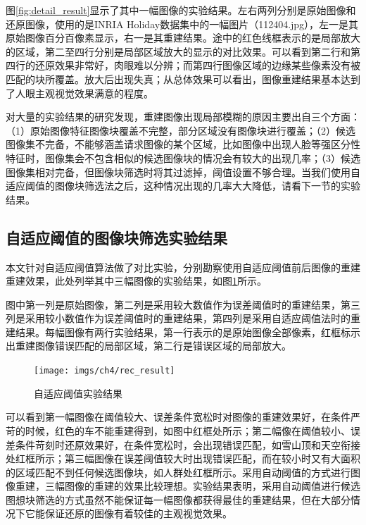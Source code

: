 图\ref{fig:detail_result}显示了其中一幅图像的实验结果。左右两列分别是原始图像和还原图像，使用的是INRIA Holiday数据集中的一幅图片（112404.jpg），左一是其原始图像百分百像素显示，右一是其重建结果。途中的红色线框表示的是局部放大的区域，第二至四行分别是局部区域放大的显示的对比效果。可以看到第二行和第四行的还原效果非常好，肉眼难以分辨；而第四行图像区域的边缘某些像素没有被匹配的块所覆盖。放大后出现失真；从总体效果可以看出，图像重建结果基本达到了人眼主观视觉效果满意的程度。

对大量的实验结果的研究发现，重建图像出现局部模糊的原因主要出自三个方面：（1）原始图像特征图像块覆盖不完整，部分区域没有图像块进行覆盖；（2）候选图像集不完备，不能够涵盖请求图像的某个区域，比如图像中出现人脸等强区分性特征时，图像集会不包含相似的候选图像块的情况会有较大的出现几率；（3）候选图像集相对完备，但图像块筛选时将其过滤掉，阈值设置不够合理。当我们使用自适应阈值的图像块筛选法之后，这种情况出现的几率大大降低，请看下一节的实验结果。

\subsection{自适应阈值的图像块筛选实验结果}
本文针对自适应阈值算法做了对比实验，分别勘察使用自适应阈值前后图像的重建重建效果，此处列举其中三幅图像的实验结果，如图\ref{fig:result}所示。

图中第一列是原始图像，第二列是采用较大数值作为误差阈值时的重建结果，第三列是采用较小数值作为误差阈值时的重建结果，第四列是采用自适应阈值法时的重建结果。每幅图像有两行实验结果，第一行表示的是原始图像全部像素，红框标示出重建图像错误匹配的局部区域，第二行是错误区域的局部放大。

\begin{figure}
\centering\texttt{[image: imgs/ch4/rec\_result]}
\caption{自适应阈值实验结果}
\label{fig:result}
\end{figure}

可以看到第一幅图像在阈值较大、误差条件宽松时对图像的重建效果好，在条件严苛的时候，红色的车不能重建得到，如图中红框处所示；第二幅像在阈值较小、误差条件苛刻时还原效果好，在条件宽松时，会出现错误匹配，如雪山顶和天空衔接处红框所示；第三幅图像在误差阈值较大时出现错误匹配，而在较小时又有大面积的区域匹配不到任何候选图像块，如人群处红框所示。采用自动阈值的方式进行图像重建，三幅图像的重建的效果比较理想。实验结果表明，采用自动阈值进行候选图想块筛选的方式虽然不能保证每一幅图像都获得最佳的重建结果，但在大部分情况下它能保证还原的图像有着较佳的主观视觉效果。


\ifx\usechapbib\empty
\nocite{BSTcontrol}


\fi
